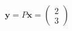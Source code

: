 \documentclass[preview]{standalone}
\begin{document}
\begin{align*}
\mathbf{y} = P \mathbf{x} = \begin{pmatrix} 2 \\ 3 \end{pmatrix}
\end{align*}
\end{document}
